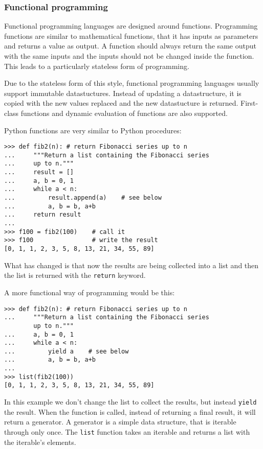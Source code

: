 \subsubsection{Functional programming}

Functional programming languages are designed around functions. Programming
functions are similar to mathematical functions, that it has inputs as
parameters and returns a value as output. A function should always return the
same output with the same inputs and the inputs should not be changed inside the
function. This leads to a particularly stateless form of programming.

Due to the stateless form of this style, functional programming languages
usually support immutable datastuctures. Instead of updating a datastructure, it
is copied with the new values replaced and the new datastucture is returned.
First-class functions and dynamic evaluation of functions are also
supported.\cite{website:persistent-struct}

Python functions are very similar to Python procedures:
\begin{verbatim}
>>> def fib2(n): # return Fibonacci series up to n
...     """Return a list containing the Fibonacci series
...     up to n."""
...     result = []
...     a, b = 0, 1
...     while a < n:
...         result.append(a)    # see below
...         a, b = b, a+b
...     return result
...
>>> f100 = fib2(100)    # call it
>>> f100                # write the result
[0, 1, 1, 2, 3, 5, 8, 13, 21, 34, 55, 89]
\end{verbatim}
What has changed is that now the results are being collected into a list and
then the list is returned with the \verb;return;
keyword.\cite[4.6. Defining Functions]{website:python-functions}

A more functional way of programming would be this:
\begin{verbatim}
>>> def fib2(n): # return Fibonacci series up to n
...     """Return a list containing the Fibonacci series
        up to n."""
...     a, b = 0, 1
...     while a < n:
...         yield a    # see below
...         a, b = b, a+b
... 
>>> list(fib2(100))
[0, 1, 1, 2, 3, 5, 8, 13, 21, 34, 55, 89]
\end{verbatim}
In this example we don't change the list to collect the results, but instead
\verb;yield; the result. When the function is called, instead of returning a
final result, it will return a generator. A generator is a simple data
structure, that is iterable through only once. The \verb;list; function takes an
iterable and returns a list with the iterable's elements.

